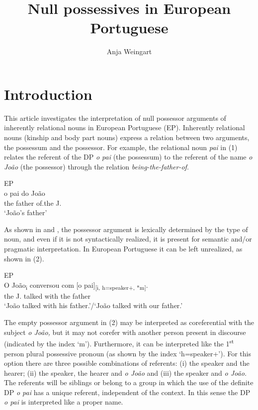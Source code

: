 \documentclass[output=paper]{langsci/langscibook}
\author{Anja Weingart\affiliation{Georg-August-Universität Göttingen}}
\title{Null possessives in European Portuguese}
\begin{document}
\section{Introduction}%

This article investigates the interpretation of null possessor arguments of inherently relational nouns in European Portuguese (EP). Inherently relational nouns (kinship and body part nouns) express a relation between two arguments, the possessum and the possessor. For example, the relational noun \textit{pai} in (1) relates the referent of the DP \textit{o pai} (the possessum) to the referent of the name \textit{o João} (the possessor) through the relation \textit{being-the-father-of}.

\ea%
         EP\label{ex:wein:1}\\
    \gll o   pai   do   João\\
         the   father of.the   J.\\
    \glt ‘João’s father’
    \z


As shown in \citet{Barker2011} and \citet{Löbner2011}, the possessor argument is lexically determined by the type of noun, and even if it is not syntactically realized, it is present for semantic and/or pragmatic interpretation. In European Portuguese it can be left unrealized, as shown in (2).

\ea%
         EP\label{ex:wein:2}\\
    \gll O  João\textsubscript{i}   conversou     com [o   pai]\textsubscript{[i, h=speaker+, *m]}.\\
         the J.     talked   with the father\\
    \glt ‘João talked with his father.’\slash ‘João talked with our father.’
\z

The empty possessor argument in (2) may be interpreted as coreferential with the subject \textit{o João,} but it may not corefer with another person present in discourse (indicated by the index ‘m’). Furthermore, it can be interpreted like the 1\textsuperscript{st} person plural possessive pronoun (as shown by the index ‘h=speaker+’). For this option there are three possible combinations of referents: (i) the speaker and the hearer; (ii) the speaker, the hearer and \textit{o João} and (iii) the speaker and \textit{o João.} The referents will be siblings or belong to a group in which the use of the definite DP \textit{o pai} has a unique referent, independent of the context. In this sense the DP \textit{o pai} is interpreted like a proper name.
\end{document}

